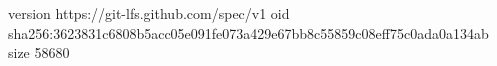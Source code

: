 version https://git-lfs.github.com/spec/v1
oid sha256:3623831c6808b5acc05e091fe073a429e67bb8c55859c08eff75c0ada0a134ab
size 58680
